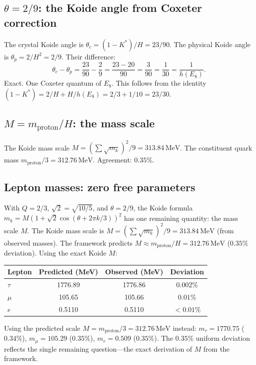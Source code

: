 \documentclass[11pt,a4paper]{article}
\theoremstyle{definition}
\theoremstyle{remark}
\begin{document}
\subsection{$\theta = 2/9$: the Koide angle from Coxeter correction}

The crystal Koide angle is $\theta_c = (1-K^*)/H = 23/90$. The physical Koide angle is $\theta_p = 2/H^2 = 2/9$. Their difference:
\begin{equation}
\theta_c - \theta_p = \frac{23}{90} - \frac{2}{9} = \frac{23 - 20}{90} = \frac{3}{90} = \frac{1}{30} = \frac{1}{h(E_8)}.
\end{equation}
Exact. One Coxeter quantum of $E_8$. This follows from the identity $(1-K^*) = 2/H + H/h(E_8) = 2/3 + 1/10 = 23/30$.

\subsection{$M = m_{\mathrm{proton}}/H$: the mass scale}

The Koide mass scale $M = (\sum\sqrt{m_k})^2 / 9 = 313.84\,\mathrm{MeV}$. The constituent quark mass $m_{\mathrm{proton}}/3 = 312.76\,\mathrm{MeV}$. Agreement: $0.35\%$.

\subsection{Lepton masses: zero free parameters}

With $Q = 2/3$, $\sqrt{2} = \sqrt{10/5}$, and $\theta = 2/9$, the Koide formula $m_k = M(1 + \sqrt{2}\cos(\theta + 2\pi k/3))^2$ has one remaining quantity: the mass scale $M$. The Koide mass scale is $M = (\sum\sqrt{m_k})^2/9 = 313.84\,\mathrm{MeV}$ (from observed masses). The framework predicts $M \approx m_{\mathrm{proton}}/H = 312.76\,\mathrm{MeV}$ ($0.35\%$ deviation). Using the exact Koide $M$:

\begin{center}
\begin{tabular}{lccc}
\toprule
Lepton & Predicted (MeV) & Observed (MeV) & Deviation \\
\midrule
$\tau$ & 1776.89 & 1776.86 & $0.002\%$ \\
$\mu$ & 105.65 & 105.66 & $0.01\%$ \\
$e$ & 0.5110 & 0.5110 & $< 0.01\%$ \\
\bottomrule
\end{tabular}
\end{center}

Using the predicted scale $M = m_{\mathrm{proton}}/3 = 312.76\,\mathrm{MeV}$ instead: $m_\tau = 1770.75$ ($0.34\%$), $m_\mu = 105.29$ ($0.35\%$), $m_e = 0.509$ ($0.35\%$). The $0.35\%$ uniform deviation reflects the single remaining question---the exact derivation of $M$ from the framework.
\end{document}
